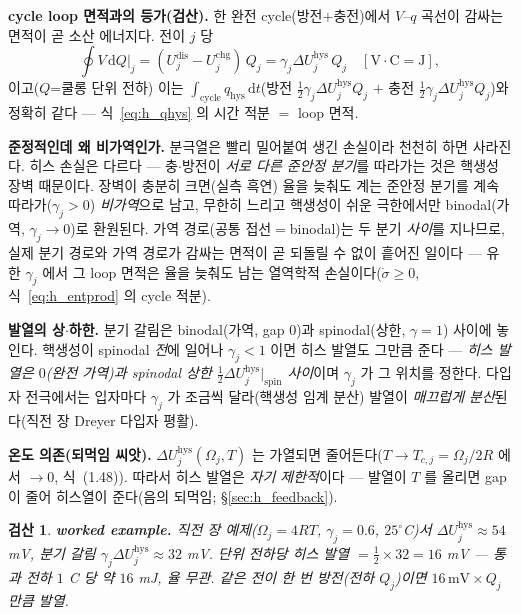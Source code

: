 \documentclass[11pt,a4paper]{article}
\newtheorem*{verifybox}{검산}
\newcommand{\dd}{\mathrm{d}}
\newcommand{\dis}{\mathrm{dis}}
\newcommand{\chg}{\mathrm{chg}}
\newcommand{\hys}{\mathrm{hys}}
\begin{document}
\textbf{cycle loop 면적과의 등가(검산).} 한 완전 cycle(방전$+$충전)에서 $V$--$q$ 곡선이 감싸는 면적이 곧 소산
에너지다. 전이 $j$ 당
\begin{equation}
\oint V\,\dd Q\Big|_j=(U_j^\dis-U_j^\chg)\,Q_j=\gamma_j\Delta U_j^\hys\,Q_j\quad[\mathrm{V\cdot C=J}],
\label{eq:h_loop}
\end{equation}
이고($Q$=쿨롱 단위 전하) 이는 $\int_\mathrm{cycle}q_\hys\,\dd t$(방전 $\tfrac12\gamma_j\Delta U_j^\hys Q_j$ $+$ 충전
$\tfrac12\gamma_j\Delta U_j^\hys Q_j$)와 정확히 같다 — 식~\eqref{eq:h_qhys} 의 시간 적분 $=$ loop 면적. \checkmark

\textbf{준정적인데 왜 비가역인가.} 분극열은 빨리 밀어붙여 생긴 손실이라 천천히 하면 사라진다. 히스 손실은 다르다 —
충$\cdot$방전이 \emph{서로 다른 준안정 분기}를 따라가는 것은 핵생성 장벽 때문이다. 장벽이 충분히 크면(실측 흑연)
율을 늦춰도 계는 준안정 분기를 계속 따라가($\gamma_j>0$) \emph{비가역}으로 남고, 무한히 느리고 핵생성이 쉬운
극한에서만 binodal(가역, $\gamma_j\to0$)로 환원된다. 가역 경로(공통 접선$=$binodal)는 두 분기 \emph{사이}를
지나므로, 실제 분기 경로와 가역 경로가 감싸는 면적이 곧 되돌릴 수 없이 흩어진 일이다 — 유한 $\gamma_j$ 에서 그
loop 면적은 율을 늦춰도 남는 열역학적 손실이다($\dot\sigma\ge0$, 식~\eqref{eq:h_entprod} 의 cycle 적분).

\textbf{발열의 상$\cdot$하한.} 분기 갈림은 binodal(가역, gap $0$)과 spinodal(상한, $\gamma=1$) 사이에 놓인다.
핵생성이 spinodal \emph{전}에 일어나 $\gamma_j<1$ 이면 히스 발열도 그만큼 준다 — \emph{히스 발열은 $0$(완전 가역)과
spinodal 상한 $\tfrac12\Delta U_j^\hys|_\mathrm{spin}$ 사이}이며 $\gamma_j$ 가 그 위치를 정한다. 다입자 전극에서는
입자마다 $\gamma_j$ 가 조금씩 달라(핵생성 임계 분산) 발열이 \emph{매끄럽게 분산}된다(직전 장 Dreyer 다입자 평활).

\textbf{온도 의존(되먹임 씨앗).} $\Delta U_j^\hys(\Omega_j,T)$ 는 가열되면 줄어든다($T\to T_{c,j}=\Omega_j/2R$ 에서
$\to0$, 식~(1.48)). 따라서 히스 발열은 \emph{자기 제한적}이다 — 발열이 $T$ 를 올리면 gap 이 줄어 히스열이 준다(음의
되먹임; \S\ref{sec:h_feedback}).
\begin{verifybox}
\textbf{worked example.} 직전 장 예제($\Omega_j=4RT$, $\gamma_j=0.6$, $25^\circ$C)서 $\Delta U_j^\hys\approx54$
mV, 분기 갈림 $\gamma_j\Delta U_j^\hys\approx32$ mV. 단위 전하당 히스 발열 $=\tfrac12\times32=16$ mV — 통과 전하
$1$ C 당 약 $16$ mJ, \emph{율 무관}. 같은 전이 한 번 방전(전하 $Q_j$)이면 $16\,\mathrm{mV}\times Q_j$ 만큼 발열.
\end{verifybox}

\end{document}

